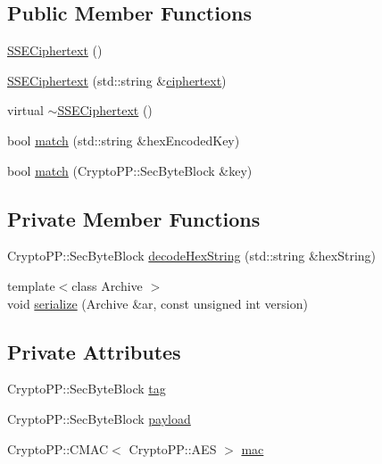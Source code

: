 \subsection*{Public Member Functions}
\begin{DoxyCompactItemize}
\item 
\hyperlink{classSSECiphertext_af8584c9ba9fa27ff1c517fcbea5e0c23}{S\+S\+E\+Ciphertext} ()
\item 
\hyperlink{classSSECiphertext_a77d3038e752e8ba2bca49361c422142f}{S\+S\+E\+Ciphertext} (std\+::string \&\hyperlink{classCiphertext_adef9aae9d923eb100b4a1ad58ce495f1}{ciphertext})
\item 
virtual \hyperlink{classSSECiphertext_a430e67e5f6deef79141accf4dc243ea4}{$\sim$\+S\+S\+E\+Ciphertext} ()
\item 
bool \hyperlink{classSSECiphertext_ac306ffad97bf6ee7093e0ca7f3929222}{match} (std\+::string \&hex\+Encoded\+Key)
\item 
bool \hyperlink{classSSECiphertext_abc37153050ef9bbf76638dd3c64c8a16}{match} (Crypto\+P\+P\+::\+Sec\+Byte\+Block \&key)
\end{DoxyCompactItemize}
\subsection*{Private Member Functions}
\begin{DoxyCompactItemize}
\item 
Crypto\+P\+P\+::\+Sec\+Byte\+Block \hyperlink{classSSECiphertext_af3a871206735d627f7fe7761097d307b}{decode\+Hex\+String} (std\+::string \&hex\+String)
\item 
{\footnotesize template$<$class Archive $>$ }\\void \hyperlink{classSSECiphertext_a8ef115f04a88ca1bc4e4e5ef619f5c93}{serialize} (Archive \&ar, const unsigned int version)
\end{DoxyCompactItemize}
\subsection*{Private Attributes}
\begin{DoxyCompactItemize}
\item 
Crypto\+P\+P\+::\+Sec\+Byte\+Block \hyperlink{classSSECiphertext_a22682a68ecf569e219173c6955c4403e}{tag}
\item 
Crypto\+P\+P\+::\+Sec\+Byte\+Block \hyperlink{classSSECiphertext_a90eed1ea5ce709cac4d57eb9f7ba77aa}{payload}
\item 
Crypto\+P\+P\+::\+C\+M\+AC$<$ Crypto\+P\+P\+::\+A\+ES $>$ \hyperlink{classSSECiphertext_ab2c817fd8b33aef10acf723a00c19507}{mac}
\end{DoxyCompactItemize}
